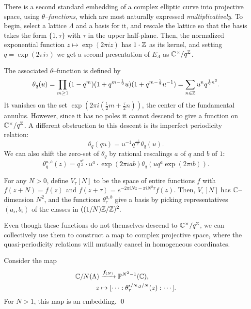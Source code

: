 There is a second standard embedding of a complex elliptic curve into projective space, using \textit{$\theta$--functions}, which are most naturally expressed \emph{multiplicatively}.  To begin, select a lattice $\Lambda$ and a basis for it, and rescale the lattice so that the basis takes the form $\{1, \tau\}$ with $\tau$ in the upper half-plane.  Then, the normalized exponential function $z \mapsto \exp(2 \pi i z)$ has $1 \cdot \mathbb Z$ as its kernel, and setting $q = \exp(2 \pi i \tau)$ we get a second presentation of $E_\Lambda$ as $\mathbb{C}^\times / q^{\mathbb Z}$.

The associated $\theta$--function is defined by \[\theta_q(u) = \prod_{m \ge 1} (1 - q^m) (1 + q^{m-\frac{1}{2}}u) (1 + q^{m-\frac{1}{2}}u^{-1}) = \sum_{n \in \mathbb Z} u^n q^{\frac{1}{2} n^2}.\]  It vanishes on the set $\exp(2 \pi i (\frac{1}{2}m + \frac{\tau}{2}n))$, the center of the fundamental annulus.  However, since it has no poles it cannot descend to give a function on $\mathbb{C}^\times / q^{\mathbb Z}$.  A different obstruction to this descent is its imperfect periodicity relation: \[\theta_q(qu) = u^{-1} q^{\frac{-1}{2}} \theta_q(u).\]  We can also shift the zero-set of $\theta_q$ by rational rescalings $a$ of $q$ and $b$ of $1$: \[\theta_q^{a,b}(z) = q^{\frac{a^2}{2}} \cdot u^a \cdot \exp(2 \pi i a b) \theta_q(u q^a \exp(2 \pi i b)).\]

\begin{remark}
For any $N > 0$, define $V_\tau[N]$ to be the space of entire functions $f$ with $f(z + N) = f(z)$ and $f(z + \tau) = e^{-2 \pi i N z - \pi i N^2 \tau} f(z)$.  Then, $V_\tau[N]$ has $\mathbb{C}$--dimension $N^2$, and the functions $\theta_\tau^{a, b}$ give a basis by picking representatives $(a_i, b_i)$ of the classes in $((1/N)\mathbb Z / \mathbb Z)^2$.
\end{remark}

Even though these functions do not themselves descend to $\mathbb{C}^\times / q^{\mathbb Z}$, we can collectively use them to construct a map to complex projective space, where the quasi-periodicity relations will mutually cancel in homogeneous coordinates.
\begin{theorem}
Consider the map
\begin{align*}
\mathbb{C} / N(\Lambda) & \xrightarrow{f_{(N)}} \mathbb{P}^{N^2-1}(\mathbb{C}), \\
z & \mapsto [\cdots : \theta_\tau^{i/N, j/N}(z) : \cdots].
\end{align*}
For $N > 1$, this map is an embedding. \qed
\end{theorem}

